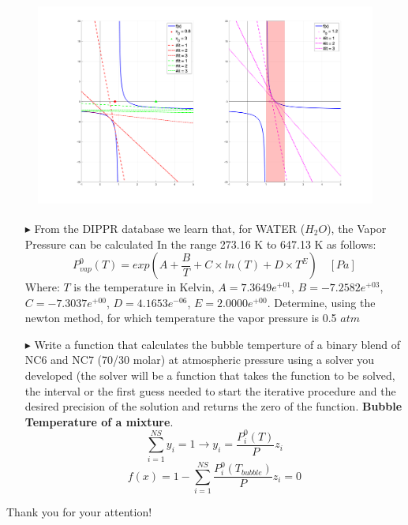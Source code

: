 \documentclass[aspectratio=169]{beamer}
\begin{document}
\begin{frame}{}
    \begin{figure}
        \centering
        \includegraphics[width=1.\textwidth]{figures/newton_choose.png}
    \end{figure}
\end{frame}

\begin{frame}{}
    \begin{itemize}
        \item[$\blacktriangleright$]
        From the DIPPR\textsuperscript{\textregistered} database we learn that, for WATER ($H_{2}O$), the Vapor Pressure can be calculated In the range 273.16 K to 647.13 K as follows:
        \begin{equation*}
            P^{0}_{vap} (T) = exp\left(A + \frac{B}{T} + C \times ln(T) + D \times T^{E}\right ) \quad [Pa]
        \end{equation*}
         Where: $T$ is the temperature in Kelvin, $A = 7.3649e^{+01}$, $B = -7.2582e^{+03}$, $C = -7.3037e^{+00}$, $D = 4.1653e^{-06}$, $E = 2.0000e^{+00}$. Determine, using the newton method, for which temperature the vapor pressure is 0.5 $atm$
    \end{itemize}
\end{frame}

\begin{frame}{}
    \begin{itemize}
        \item[$\blacktriangleright$]
        Write a function that calculates the bubble temperture of a binary blend of NC6 and NC7 (70/30 molar) at atmospheric pressure using a solver you developed (the solver will be a function that takes the function to be solved, the interval or the first guess needed to start the iterative procedure and the desired precision of the solution and returns the zero of the function. \textbf{Bubble Temperature of a mixture}.
        \begin{equation*}
            \sum_{i=1}^{NS} y_{i} = 1 \longrightarrow y_{i} = \frac{P_{i}^{0}(T)}{P}z_{i}
        \end{equation*}
        \begin{equation*}
            f(x) = 1 - \sum_{i=1}^{NS} \frac{P_{i}^{0}(T_{bubble})}{P}z_{i} = 0
        \end{equation*}
    \end{itemize}
\end{frame}

{
    \begin{frame}[standout]
        Thank you for your attention!
    \end{frame}
}
\end{document}
